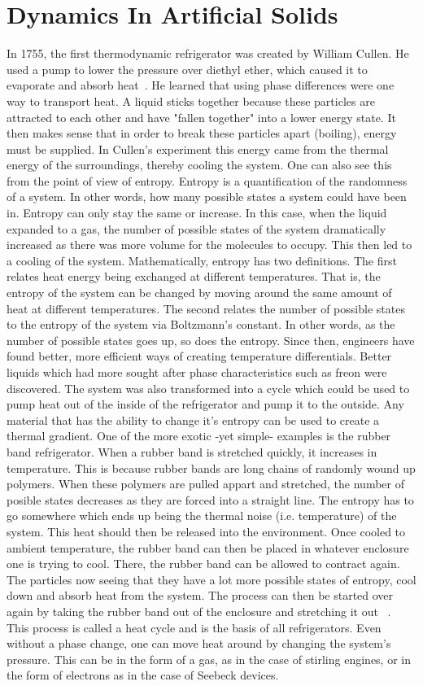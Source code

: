 \section{Dynamics In Artificial Solids}
	In 1755, the first thermodynamic refrigerator was created by William Cullen. He used a pump to lower the pressure over diethyl ether, which caused it to evaporate and absorb heat~\cite{Chandra??}. He learned that using phase differences were one way to transport heat. A liquid sticks together because these particles are attracted to each other and have "fallen together" into a lower energy state. It then makes sense that in order to break these particles apart (boiling), energy must be supplied. In Cullen's experiment this energy came from the thermal energy of the surroundings, thereby cooling the system. One can also see this from the point of view of entropy. Entropy is a quantification of the randomness of a system. In other words, how many possible states a system could have been in. Entropy can only stay the same or increase. In this case, when the liquid expanded to a gas, the number of possible states of the system dramatically increased as there was more volume for the molecules to occupy. This then led to a cooling of the system. 
	Mathematically, entropy has two definitions. The first relates heat energy being exchanged at different temperatures. That is, the entropy of the system can be changed by moving around the same amount of heat at different temperatures. The second relates the number of possible states to the entropy of the system via Boltzmann's constant. In other words, as the number of possible states goes up, so does the entropy.
	Since then, engineers have found better, more efficient ways of creating temperature differentials. Better liquids which had more sought after phase characteristics such as freon were discovered. The system was also transformed into a cycle which could be used to pump heat out of the inside of the refrigerator and pump it to the outside. Any material that has the ability to change it's entropy can be used to create a thermal gradient. One of the more exotic -yet simple- examples is the rubber band refrigerator. When a rubber band is stretched quickly, it increases in temperature. This is because rubber bands are long chains of randomly wound up polymers. When these polymers are pulled appart and stretched, the number of posible states decreases as they are forced into a straight line. The entropy has to go somewhere which ends up being the thermal noise (i.e. temperature) of the system. This heat should then be released into the environment. Once cooled to ambient temperature, the rubber band can then be placed in whatever enclosure one is trying to cool. There, the rubber band can be allowed to contract again. The particles now seeing that they have a lot more possible states of entropy, cool down and absorb heat from the system. The process can then be started over again by taking the rubber band out of the enclosure and stretching it out ~\cite{Brown63}. This process is called a heat cycle and is the basis of all refrigerators. Even without a phase change, one can move heat around by changing the system's pressure. This can be in the form of a gas, as in the case of stirling engines, or in the form of electrons as in the case of Seebeck devices. 
